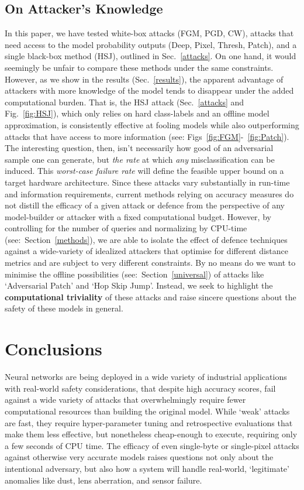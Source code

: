 \subsection{On Attacker's Knowledge}
In this paper, we have tested white-box attacks (FGM, PGD, CW), attacks that need access to the model probability outputs (Deep, Pixel, Thresh, Patch), and a single black-box method (HSJ), outlined in Sec.~\ref{attacks}.
On one hand, it would seemingly be unfair to compare these methods under the same constraints.
However, as we show in the results (Sec.~\ref{results}), the apparent advantage of attackers with more knowledge of the model tends to disappear under the added computational burden.
That is, the HSJ attack (Sec.~\ref{attacks} and Fig.~\ref{fig:HSJ}), which only relies on hard class-labels and an offline model approximation, is consistently effective at fooling models while also outperforming attacks that have access to more information (see: Figs~\ref{fig:FGM}-~\ref{fig:Patch}).
The interesting question, then, isn't necessarily how good of an adversarial sample one can generate, but \textit{the rate} at which \textit{any} misclassification can be induced.
This \textit{worst-case failure rate} will define the feasible upper bound on a target hardware architecture.
Since these attacks vary substantially in run-time and information requirements, current methods relying on accuracy measures do not distill the efficacy of a given attack or defence from the perspective of any model-builder or attacker with a fixed computational budget.
However, by controlling for the number of queries and normalizing by CPU-time (see:~Section~\ref{methods}), we are able to isolate the effect of defence techniques against a wide-variety of idealized attackers that optimise for different distance metrics and are subject to very different constraints.
By no means do we want to minimise the offline possibilities (see:~Section~\ref{universal}) of attacks like `Adversarial Patch' and `Hop Skip Jump'.
Instead, we seek to highlight the \textbf{computational triviality} of these attacks and raise sincere questions about the safety of these models in general.

\section{Conclusions}

Neural networks are being deployed in a wide variety of industrial applications with real-world safety considerations, that despite high accuracy scores, fail against a wide variety of attacks that overwhelmingly require fewer computational resources than building the original model.
While `weak' attacks are fast, they require hyper-parameter tuning and retrospective evaluations that make them less effective, but nonetheless cheap-enough to execute, requiring only a few seconds of CPU time.
The efficacy of even single-byte or single-pixel attacks against otherwise very accurate models raises questions not only about the intentional adversary, but also how a system will handle real-world, `legitimate' anomalies like dust, lens aberration, and sensor failure.

